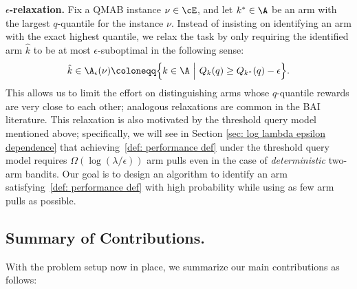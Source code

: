 \textbf{$\epsilon$-relaxation.}
Fix a QMAB instance $\nu  \in \cE$,
and let $k^* \in \A$ be an arm with the largest $q$-quantile for the instance $\nu$.
Instead of insisting on identifying an arm with the exact highest quantile, we relax the task by only requiring the identified arm $\hat{k}$ to be at most $\epsilon$-suboptimal in the following sense:
    \begin{equation}
    \label{def: performance def}
    \hat{k} \in
    \A_{\epsilon}(\nu) \coloneqq 
    \Big\{ k \in \A 
    \ \Big\vert\
     Q_k(q)
        \ge
        Q_{k^*}(q)
        - \epsilon
        \Big\}.
\end{equation}
This allows us to limit the effort on distinguishing arms whose $q$-quantile rewards are very close to each other; analogous relaxations are common in the BAI literature.
This relaxation is also motivated by the threshold query model mentioned above; specifically, we will see in Section \ref{sec: log lambda epsilon dependence} that achieving~\eqref{def: performance def} under the threshold query model requires
$\Omega(\log(\lambda/ \epsilon))$ arm pulls even in the case of \textit{deterministic} two-arm bandits.
Our goal is to design an algorithm to identify an arm satisfying~\eqref{def: performance def} with high probability while using as few arm pulls as possible.



\subsection{Summary of Contributions.}
\label{sec: contributions}
With the problem setup now in place, we summarize our main contributions as follows: 


